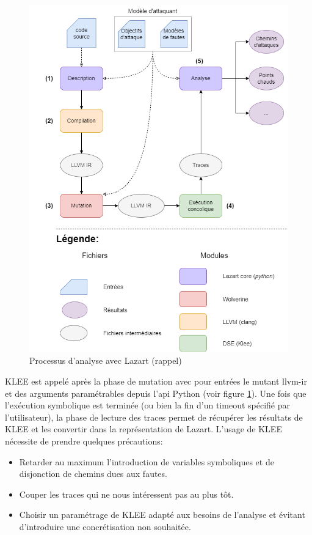         \begin{figure}[t]\centering
            \includegraphics[scale=0.4]{ch3-lazart/img/lazart-workflow4_pack.drawio.png}
            \caption{Processus d'analyse avec Lazart (rappel)}  \label{fig:lazart-analysis-scheme-ch4}
        \end{figure}
    
        KLEE est appelé après la phase de mutation avec pour entrées le mutant \gls{llvm-ir} et des arguments paramétrables depuis l'\gls{api} Python (voir figure \ref{fig:lazart-analysis-scheme-ch4}). Une fois que l'exécution symbolique est terminée (ou bien la fin d'un timeout spécifié par l'utilisateur), la phase de lecture des traces permet de récupérer les résultats de KLEE et les convertir dans la représentation de Lazart.
        L'usage de KLEE nécessite de prendre quelques précautions:
        \begin{itemize}
            \item Retarder au maximum l'introduction de variables symboliques et de disjonction de chemins dues aux fautes.
            \item Couper les traces qui ne nous intéressent pas au plus tôt.
            \item Choisir un paramétrage de KLEE adapté aux besoins de l'analyse et évitant d'introduire une concrétisation non souhaitée.
        \end{itemize}
        
